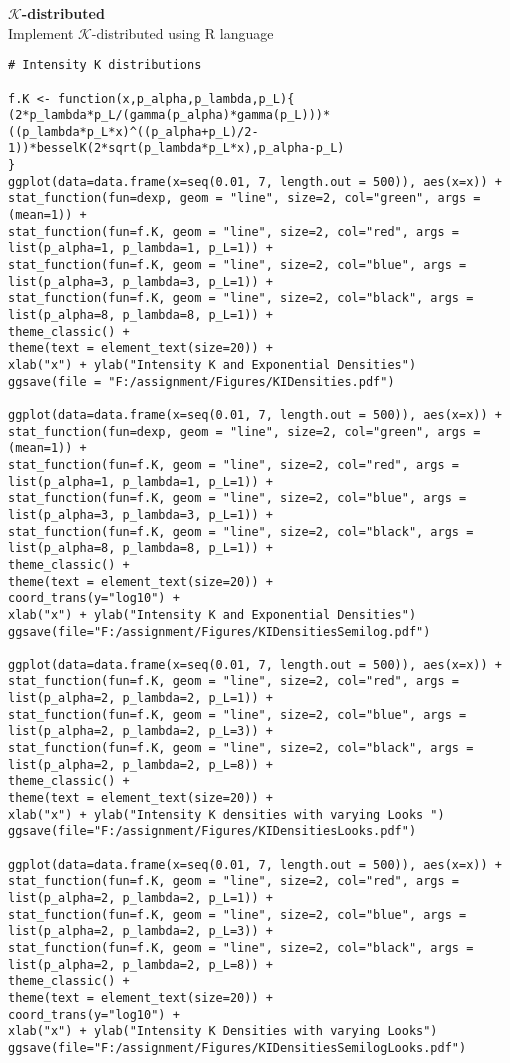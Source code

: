 \documentclass{article}
\begin{document}
\textbf{$\mathcal K$-distributed} \\
Implement $\mathcal K$-distributed using R language \\
\begin{lstlisting}
# Intensity K distributions

f.K <- function(x,p_alpha,p_lambda,p_L){
(2*p_lambda*p_L/(gamma(p_alpha)*gamma(p_L)))*((p_lambda*p_L*x)^((p_alpha+p_L)/2-1))*besselK(2*sqrt(p_lambda*p_L*x),p_alpha-p_L)
}
ggplot(data=data.frame(x=seq(0.01, 7, length.out = 500)), aes(x=x)) +
stat_function(fun=dexp, geom = "line", size=2, col="green", args = (mean=1)) +
stat_function(fun=f.K, geom = "line", size=2, col="red", args = list(p_alpha=1, p_lambda=1, p_L=1)) +
stat_function(fun=f.K, geom = "line", size=2, col="blue", args = list(p_alpha=3, p_lambda=3, p_L=1)) +
stat_function(fun=f.K, geom = "line", size=2, col="black", args = list(p_alpha=8, p_lambda=8, p_L=1)) +
theme_classic() +
theme(text = element_text(size=20)) +
xlab("x") + ylab("Intensity K and Exponential Densities")
ggsave(file = "F:/assignment/Figures/KIDensities.pdf")

ggplot(data=data.frame(x=seq(0.01, 7, length.out = 500)), aes(x=x)) +
stat_function(fun=dexp, geom = "line", size=2, col="green", args = (mean=1)) +
stat_function(fun=f.K, geom = "line", size=2, col="red", args = list(p_alpha=1, p_lambda=1, p_L=1)) +
stat_function(fun=f.K, geom = "line", size=2, col="blue", args = list(p_alpha=3, p_lambda=3, p_L=1)) +
stat_function(fun=f.K, geom = "line", size=2, col="black", args = list(p_alpha=8, p_lambda=8, p_L=1)) +
theme_classic() +
theme(text = element_text(size=20)) +
coord_trans(y="log10") +
xlab("x") + ylab("Intensity K and Exponential Densities")
ggsave(file="F:/assignment/Figures/KIDensitiesSemilog.pdf")  

ggplot(data=data.frame(x=seq(0.01, 7, length.out = 500)), aes(x=x)) +
stat_function(fun=f.K, geom = "line", size=2, col="red", args = list(p_alpha=2, p_lambda=2, p_L=1)) +
stat_function(fun=f.K, geom = "line", size=2, col="blue", args = list(p_alpha=2, p_lambda=2, p_L=3)) +
stat_function(fun=f.K, geom = "line", size=2, col="black", args = list(p_alpha=2, p_lambda=2, p_L=8)) +
theme_classic() +
theme(text = element_text(size=20)) +
xlab("x") + ylab("Intensity K densities with varying Looks ")
ggsave(file="F:/assignment/Figures/KIDensitiesLooks.pdf")  

ggplot(data=data.frame(x=seq(0.01, 7, length.out = 500)), aes(x=x)) +
stat_function(fun=f.K, geom = "line", size=2, col="red", args = list(p_alpha=2, p_lambda=2, p_L=1)) +
stat_function(fun=f.K, geom = "line", size=2, col="blue", args = list(p_alpha=2, p_lambda=2, p_L=3)) +
stat_function(fun=f.K, geom = "line", size=2, col="black", args = list(p_alpha=2, p_lambda=2, p_L=8)) +
theme_classic() +
theme(text = element_text(size=20)) +
coord_trans(y="log10") +
xlab("x") + ylab("Intensity K Densities with varying Looks")
ggsave(file="F:/assignment/Figures/KIDensitiesSemilogLooks.pdf")  
\end{lstlisting}
\end{document}
